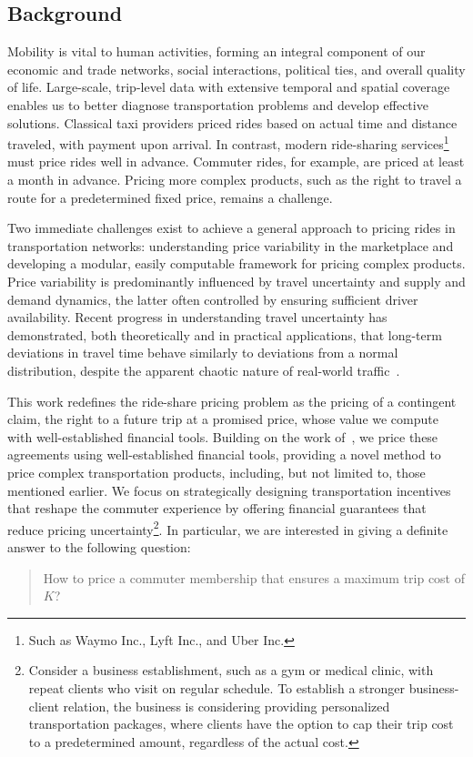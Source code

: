 \documentclass[12pt]{article}
\begin{document}
\subsection{Background}
Mobility is vital to human activities, forming an integral component of our economic and trade networks, social interactions, political ties, and overall quality of life. Large-scale, trip-level data with extensive temporal and spatial coverage enables us to better diagnose transportation problems and develop effective solutions. Classical taxi providers priced rides based on actual time and distance traveled, with payment upon arrival. In contrast, modern ride-sharing services\footnote{Such as Waymo Inc., Lyft Inc., and Uber Inc.} must price rides well in advance. Commuter rides, for example, are priced at least a month in advance. Pricing more complex products, such as the right to travel a route for a predetermined fixed price, remains a challenge.

Two immediate challenges exist to achieve a general approach to pricing rides in transportation networks: 
understanding price variability in the marketplace and developing a modular, easily computable framework for pricing complex products. Price variability is predominantly influenced by travel uncertainty and supply and demand dynamics, the latter often controlled by ensuring sufficient driver availability. Recent progress in understanding travel uncertainty has demonstrated, both theoretically and in practical applications, that long-term deviations in travel time behave similarly to deviations from a normal distribution, despite the apparent chaotic nature of real-world traffic~\citet{elmasri2020predictive, woodard2017predicting}.


This work redefines the ride-share pricing problem as the pricing of a contingent claim, the right to a future trip at a promised price, whose value we compute with well-established financial tools. Building on the work of~\citet{elmasri2020predictive}, we price these agreements using well-established financial tools, providing a novel method to price complex transportation products, including, but not limited to, those mentioned earlier. We focus on strategically designing transportation incentives that reshape the commuter experience by offering financial guarantees that reduce pricing uncertainty\footnote{Consider a business establishment, such as a gym or medical clinic, with repeat clients who visit on regular schedule. To establish a stronger business-client relation, the business is considering providing personalized transportation packages, where clients have the option to cap their trip cost to a predetermined amount, regardless of the actual cost.}. In particular, we are interested in giving a definite answer to the following question:
\begin{quote}
    How to price a commuter membership that ensures a maximum trip cost of $K$?
\end{quote}
\end{document}
